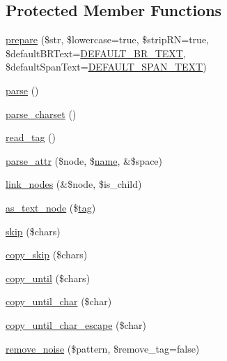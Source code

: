 \subsection*{Protected Member Functions}
\begin{DoxyCompactItemize}
\item 
\hyperlink{classsimple__html__dom_a5c2e8093a84d64af2fdcbd9116a297d1}{prepare} (\$str, \$lowercase=true, \$strip\+R\+N=true, \$default\+B\+R\+Text=\hyperlink{simple__html__dom_8php_a898bdf60fe4d05c1c50013eed5e2c6e8}{D\+E\+F\+A\+U\+L\+T\+\_\+\+B\+R\+\_\+\+T\+E\+X\+T}, \$default\+Span\+Text=\hyperlink{simple__html__dom_8php_a30d58d7d3a53efc61f064b53a434bafe}{D\+E\+F\+A\+U\+L\+T\+\_\+\+S\+P\+A\+N\+\_\+\+T\+E\+X\+T})
\item 
\hyperlink{classsimple__html__dom_a38d99acc70a1d8fd8f94455743b2d237}{parse} ()
\item 
\hyperlink{classsimple__html__dom_a519f20b58429f11fb3c3839efcc7f484}{parse\+\_\+charset} ()
\item 
\hyperlink{classsimple__html__dom_a11913c53d09e73dc367062ee54abde20}{read\+\_\+tag} ()
\item 
\hyperlink{classsimple__html__dom_a6d54ee34e0f121005da327b6fe0ab7e4}{parse\+\_\+attr} (\$node, \$\hyperlink{dom__testcase_8php_a7e76f3957f225b9a14d6fab0a55392ce}{name}, \&\$space)
\item 
\hyperlink{classsimple__html__dom_a19edb141f64d5d085874f2e75e0aa333}{link\+\_\+nodes} (\&\$node, \$is\+\_\+child)
\item 
\hyperlink{classsimple__html__dom_a17ff0dd434a94d34972e3c90fbd0d545}{as\+\_\+text\+\_\+node} (\$\hyperlink{element__testcase_8php_a18413934cd1931907ddc5ac04031be0a}{tag})
\item 
\hyperlink{classsimple__html__dom_a83de9b35df2e0857f2b0be5bff3e4960}{skip} (\$chars)
\item 
\hyperlink{classsimple__html__dom_a48081dad72c2e828f05ae7420d95c820}{copy\+\_\+skip} (\$chars)
\item 
\hyperlink{classsimple__html__dom_a607299237161af9369abc2d2605715d5}{copy\+\_\+until} (\$chars)
\item 
\hyperlink{classsimple__html__dom_a0dcd73e05f3cee1eafe3ec6fa347c36b}{copy\+\_\+until\+\_\+char} (\$char)
\item 
\hyperlink{classsimple__html__dom_a2df9f8464f8daf439f9fa740ebdc0ede}{copy\+\_\+until\+\_\+char\+\_\+escape} (\$char)
\item 
\hyperlink{classsimple__html__dom_a5bf6f05cd9b47a87912de85a6a556b6b}{remove\+\_\+noise} (\$pattern, \$remove\+\_\+tag=false)
\end{DoxyCompactItemize}

